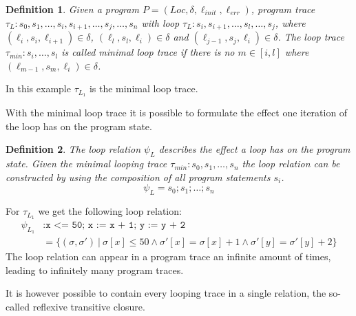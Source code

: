 \documentclass{article}
\newcounter{example}[section]
\newtheorem{mydef}{Definition}
\newcommand\mycom[1]{}
\newcommand\mycom[1]{#1}
\newcommand{\dd}[1]{\mycom{\todo[color=orange!40,inline]{\small DD: #1}}}
\newcommand{\ts}[1]{\mycom{\todo[color=green!40,inline]{\small TS: #1}}}
\begin{document}
\begin{mydef}
    Given a program $P = (Loc, \delta, \ell_{init}, \ell_{err})$, program trace \\ $\tau_L: s_0, s_1, \ldots, s_i, s_{i+1}, \ldots, s_j, \ldots, s_n$ with loop $\tau_L: s_i, s_{i+1}, \ldots, s_l, \ldots, s_j$, where $(\ell_i, s_i, \ell_{i+1}) \in \delta$, $(\ell_l, s_l, \ell_i) \in \delta$ and $(\ell_{j-1}, s_j, \ell_i) \in \delta$. The loop trace $\tau_{min}: s_i, \ldots, s_l$ is called minimal loop trace if there is no $m \in [i, l]$ where $(\ell_{m-1}, s_m, \ell_i) \in \delta$.
\end{mydef}
\ts{Complicated. I don't think you need a loop containing another loop for this definition.}

In this example $\tau_{L_1}$ is the minimal loop trace. 
\dd{which example?}

With the minimal loop trace it is possible to formulate the effect one iteration of the loop has on the program state.
\begin{mydef}
    The loop relation $\psi_L$ describes the effect a loop has on the program state.
    Given the minimal looping trace $\tau_{min}: s_0, s_1, \ldots, s_{n}$ the loop relation can be constructed by using the composition of all program statements $s_i$.
    \begin{equation*}
        \psi_L = s_0; s_1; \ldots; s_n
    \end{equation*}
\end{mydef}
\dd{Dont switch between ``loop trace'' and ``looping trace''}

For $\tau_{L_1}$ we get the following loop relation:
\begin{align*}
     \psi_{L_1}&:	\texttt{x <= 50; x := x + 1; y := y + 2} \ \\
     &= \{(\sigma, \sigma')\ |\ \sigma[x] \leq 50 \land \sigma'[x] = \sigma[x] + 1 \land \sigma'[y] = \sigma'[y] + 2 \}
\end{align*}
The loop relation can appear in a program trace an infinite amount of times, leading to infinitely many program traces.
\ts{How can a relation appear in a trace? You mean the sequence of statements forming the loop.}
\dd{Also: Write it as $\psi_{L_1} = \psi(s_i s_{i+1} \ldots)$ = \{\ldots\}}
It is however possible to contain every looping trace in a single relation, the so-called reflexive transitive closure.
\dd{What is a looping trace? A loop trace? 
I think you want to talk about all the loop unwindings that can be ``extracted'' from a looping trace. 
I.e., if we have a trace $\tau = s_0 s_1 s_2 s_3 ...$ and $A = s_i s_{i+1}$ is a looping trace in $\tau$ with a loop relation $\psi_A$, then we want to express $\psi_A^*$ with a finite formula. 
}
\end{document}
